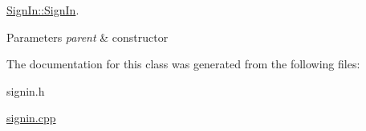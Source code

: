 \hyperlink{classSignIn_a04e5dafeffb5598121044815b0059adc}{Sign\-In\-::\-Sign\-In}. 


\begin{DoxyParams}{Parameters}
{\em parent} & constructor \\
\hline
\end{DoxyParams}


The documentation for this class was generated from the following files\-:\begin{DoxyCompactItemize}
\item 
signin.\-h\item 
\hyperlink{signin_8cpp}{signin.\-cpp}\end{DoxyCompactItemize}
